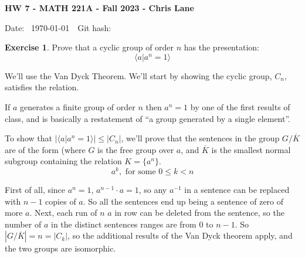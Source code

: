 \documentclass[11pt,oneside]{article}
\numberwithin{equation}{section}
\theoremstyle{definition}
\newtheorem{exercise}{Exercise}
\begin{document}
\textbf{HW 7 - MATH 221A - Fall 2023 - Chris Lane}

Date: \hhmmsstime{} \ \today \ \ Git hash: 


\begin{exercise}
  Prove that a cyclic group of order $n$ has the presentation:
  \[
  \langle a | a^n = 1 \rangle
  \]
\end{exercise}
\begin{solution}

  We'll use the Van Dyck Theorem.  We'll start by showing the cyclic
  group, $C_n$, satisfies the relation.

  If $a$ generates a finite group of order $n$ then $ a ^ n = 1$
  by one of the first results of class, and is basically a restatement of
  ``a group generated by a single element''.

  To show that $ |  \langle a | a^n = 1 \rangle |  \leq |C_n|$, we'll prove that
  the sentences in the group $G / \overline K $  are of the form (where $G$ is the
  free group over ${a}$, and $\overline K$ is the smallest normal subgroup containing
  the relation $K = \{ a^n\}$.  
  \[
  a ^ k, \textrm{ for some } 0 \leq k < n
  \]

  First of all, since $a ^ n = 1$, $a ^ {n-1} \cdot a = 1$, so any $a^{-1}$ in a sentence
  can be replaced with $n-1 $ copies of $a$.  So all the sentences end up being
  a sentence of zero of more $a$.  Next, each run of $n$ $a$ in row can be
  deleted from the sentence, so the number of $a$ in the distinct sentences ranges are
  from $0$ to $n-1$.  So $|G / \overline K| = n = |C_k|$, so the
  additional results of the Van Dyck theorem apply, and the two groups are isomorphic.  
\end{solution}
\end{document}
